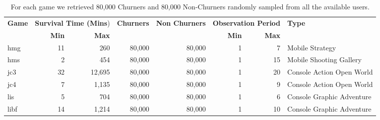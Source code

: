 \begin{table}[h] 
\centering
\caption[\textbf{Data-set Description}]{For each game we retrieved 80,000 Churners and 80,000 Non-Churners randomly sampled from all the available users.}
\label{game_description_31}
\begin{tabularx}{\textwidth}{@{}lrrrrrrX@{}}
\toprule

\multirow{2}{*}{\textbf{Game}} & \multicolumn{2}{l}{\textbf{Survival Time (Mins})} & \multirow{2}{*}{\textbf{Churners}} & \multirow{2}{*}{\textbf{Non Churners}} & \multicolumn{2}{l}{\textbf{Observation Period}} & \multirow{2}{*}{\textbf{Type}} \\ \cmidrule(lr){2-3} \cmidrule(lr){6-7}
                      & \textbf{Min}                  & \textbf{Max}                  &                           &                               & \textbf{Min}                & \textbf{Max}               &                                \\ \midrule
hmg                        & 11 & 260    & 80,000 & 80,000  & 1  & 7  & Mobile Strategy                       \\
hms                        & 2 & 454     & 80,000 & 80,000  & 1  & 15 & Mobile Shooting Gallery                \\
jc3                        & 32 & 12,695 & 80,000 & 80,000  & 1  & 20 & Console Action Open World             \\
jc4                        & 7 & 1,135   & 80,000 & 80,000  & 1  & 9  & Console Action Open World           \\
lis                        & 5 & 704     & 80,000 & 80,000  & 1  & 6  & Console Graphic Adventure \\
libf                       & 14 & 1,214  & 80,000 & 80,000  & 1  & 10 &  Console Graphic Adventure \\ \bottomrule
\end{tabularx}
\end{table}